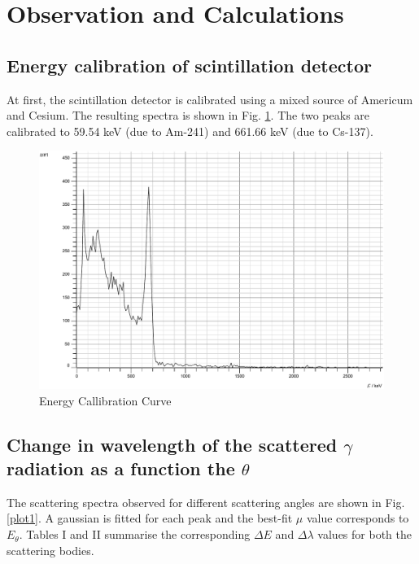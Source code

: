 \section{Observation and Calculations}

\subsection{Energy calibration of scintillation detector}
At first, the scintillation detector is calibrated using a mixed source of Americum and Cesium. The resulting spectra is shown in Fig. \ref{calib}. The two peaks are calibrated to 59.54 keV (due to Am-241) and 661.66 keV (due to Cs-137). 

\begin{figure}[H]
    \centering
    \includegraphics[width=1\columnwidth]{images/al_calib.pdf}
    \caption{Energy Callibration Curve}
    \label{calib}
\end{figure}

\subsection{Change in wavelength of the scattered $\gamma$ radiation as a function the $\theta$}

The scattering spectra observed for different scattering angles are shown in Fig. \ref{plot1}. A gaussian is fitted for each peak and the best-fit $\mu$ value corresponds to $E_\theta$. Tables I and II summarise the corresponding $\Delta E$ and $\Delta \lambda$ values for both the scattering bodies.


